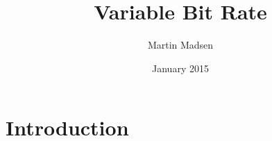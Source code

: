 \documentclass{article}
\title{Variable Bit Rate}
\author{Martin Madsen}
\date{January 2015}
\begin{document}
\maketitle

\section{Introduction}
\end{document}
